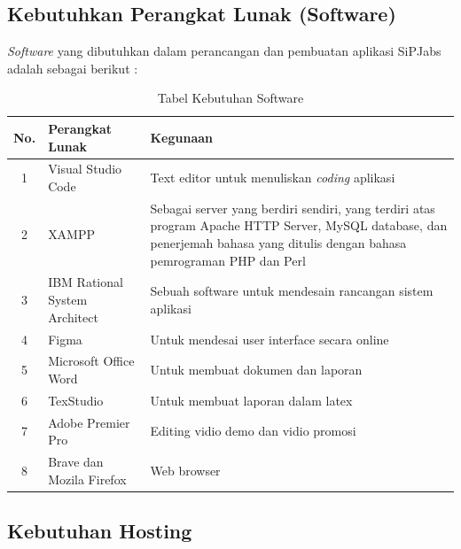 \newpage
\subsection{Kebutuhkan Perangkat Lunak (Software)}

\textit{Software} yang dibutuhkan dalam perancangan dan pembuatan aplikasi SiPJabs
adalah sebagai berikut :

\begin{table}[H]
	\centering
	\caption{Tabel Kebutuhan Software}
	\begin{tabular}{ | c | l | p{65mm} | }
		\hline
		No. & Perangkat Lunak & Kegunaan \\
		\hline
		
		1 & Visual Studio Code & Text editor untuk menuliskan \textit{coding} aplikasi \\
				
		\hline
		
		2 & XAMPP & Sebagai server yang berdiri sendiri, yang terdiri atas program Apache HTTP Server, MySQL database, dan penerjemah bahasa yang ditulis dengan bahasa pemrograman PHP dan Perl \\
		
		\hline
		
		3 & IBM Rational System Architect  & Sebuah software untuk mendesain rancangan sistem aplikasi \\
		
		\hline
		
		4 & Figma & Untuk mendesai user interface secara online \\
		
		
		\hline
		
		5 & Microsoft Office Word & Untuk membuat dokumen dan laporan \\
		
		\hline
		
		6 & TexStudio & Untuk membuat laporan dalam latex \\
		
		\hline
		
		7 & Adobe Premier Pro & Editing vidio demo dan vidio promosi \\
		
		\hline
		
		8 & Brave dan Mozila Firefox & Web browser \\
		
		\hline
	\end{tabular}
\end{table}

\subsection{Kebutuhan Hosting}

